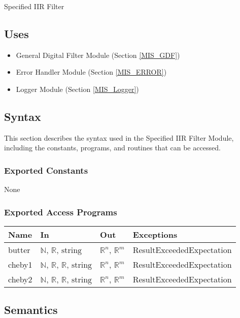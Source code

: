 \documentclass[12pt, titlepage]{article}
\begin{document}
Specified IIR Filter

\subsection{Uses}

\begin{itemize}
\item General Digital Filter Module (Section \ref{MIS_GDF})
\item Error Handler Module (Section \ref{MIS_ERROR})
\item Logger Module (Section \ref{MIS_Logger})
\end{itemize}

\subsection{Syntax}

This section describes the syntax used in the Specified IIR Filter Module,
including the constants, programs, and routines that can be accessed.

\subsubsection{Exported Constants}

None

\subsubsection{Exported Access Programs}

\begin{center}
\begin{tabular}{p{2cm} p{4cm} p{4cm} p{5cm}}
\hline
\textbf{Name} & \textbf{In} & \textbf{Out} & \textbf{Exceptions} \\
\hline
butter & $\mathbb{N}$, $\mathbb{R}$, $\text{string}$ & $\mathbb{R}^{n}$,
$\mathbb{R}^{m}$ & ResultExceededExpectation \\
cheby1 & $\mathbb{N}$, $\mathbb{R}$, $\mathbb{R}$, $\text{string}$ &
$\mathbb{R}^{n}$, $\mathbb{R}^{m}$ & ResultExceededExpectation \\
cheby2 & $\mathbb{N}$, $\mathbb{R}$, $\mathbb{R}$, $\text{string}$ &
$\mathbb{R}^{n}$, $\mathbb{R}^{m}$ & ResultExceededExpectation \\
\hline
\end{tabular}
\end{center}

\subsection{Semantics}
\end{document}
